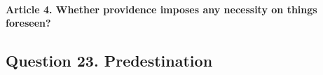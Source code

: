 \documentclass{ucetd}
\begin{document}
\paragraph{Article 4. Whether providence imposes any necessity on things foreseen?}
\subsection{Question 23. Predestination}
\end{document}
